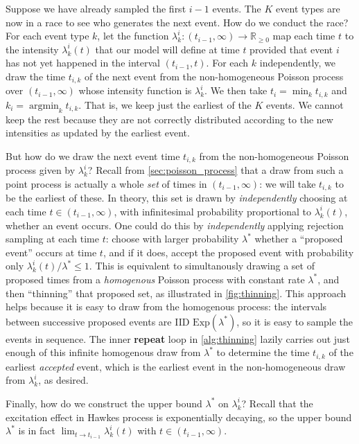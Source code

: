 \documentclass{article}
\DeclareMathOperator*{\argmin}{argmin}
\newcommand{\Real}{\mathbb{R}}
\newcommand{\Exp}{\mathrm{Exp}}
\begin{document}
Suppose we have already sampled the first $i-1$ events.
The $K$ event types are now in a race to see who generates the next event. How do we conduct the race?  For each event type $k$, let the function $\lambda_k^i: (t_{i-1},\infty) \rightarrow \Real_{\geq 0}$ map each time $t$ to the intensity $\lambda_k^i(t)$ that our model will define at time $t$
provided that event $i$ has not yet happened in the interval $(t_{i-1},t)$.  For each $k$ independently, we draw the time $t_{i,k}$ of the next event from the non-homogeneous Poisson process over $(t_{i-1},\infty)$ whose intensity function is $\lambda_k^i$.  We then take $t_i = \min_k t_{i,k}$ and $k_i = \argmin_k t_{i,k}$.  That is, we keep just the earliest of the $K$ events.  We cannot keep the rest because they are not correctly distributed according to the new intensities as updated by the earliest event.

But how do we draw the next event time $t_{i,k}$ from the non-homogeneous Poisson process given by $\lambda_k^i$?  Recall from \ref{sec:poisson_process} that a draw from such a point process is actually a whole {\em set} of times in $(t_{i-1},\infty)$: we will take $t_{i,k}$ to be the earliest of these.  In theory, this set is drawn by {\em independently} choosing at each time $t \in (t_{i-1},\infty)$, with infinitesimal probability proportional to $\lambda_k^i(t)$, whether an event occurs.  One could do this by {\em independently} applying rejection sampling at each time $t$: choose with larger probability $\lambda^*$ whether a ``proposed event'' occurs at time $t$, and if it does, accept the proposed event with probability only $\lambda_k^i(t)/{\lambda^*} \leq 1$. This is equivalent to simultanously drawing a set of proposed times from a {\em homogenous} Poisson process with constant rate $\lambda^*$, and then ``thinning'' that proposed set, as illustrated in \cref{fig:thinning}.   This approach helps because it is easy to draw from the homogenous process: the intervals between successive proposed events are IID $\Exp(\lambda^*)$, so it is easy to sample the events in sequence.  The inner {\bf repeat} loop in \cref{alg:thinning} lazily carries out just enough of this infinite homogenous draw from $\lambda^*$ to determine the time $t_{i,k}$ of the earliest {\em accepted} event, which is the earliest event in the non-homogeneous draw from $\lambda_k^i$, as desired.

Finally, how do we construct the upper bound $\lambda^*$ on $\lambda_k^i$?
Recall that the excitation effect in Hawkes process is exponentially decaying, so the upper bound $\lambda^*$ is in fact $\lim_{t \rightarrow t_{i-1}}\lambda_{k}^i(t)$ with $t \in ( t_{i-1}, \infty)$. 
\end{document}
